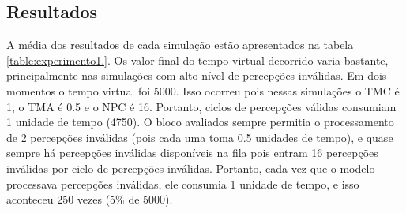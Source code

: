 \subsection{Resultados}

A média dos resultados de cada simulação estão apresentados na tabela \ref{table:experimento1.}. Os valor final do tempo virtual decorrido varia bastante, principalmente nas simulações com alto nível de percepções inválidas. Em dois momentos o tempo virtual foi 5000. Isso ocorreu pois nessas simulações o TMC é 1, o TMA é 0.5 e o NPC é 16. Portanto, ciclos de percepções válidas consumiam 1 unidade de tempo (4750). O bloco avaliados sempre permitia o processamento de 2 percepções inválidas (pois cada uma toma 0.5 unidades de tempo), e quase sempre há percepções inválidas disponíveis na fila pois entram 16 percepções inválidas por ciclo de percepções inválidas. Portanto, cada vez que o modelo processava percepções inválidas, ele consumia 1 unidade de tempo, e isso aconteceu 250 vezes (5\% de 5000).

